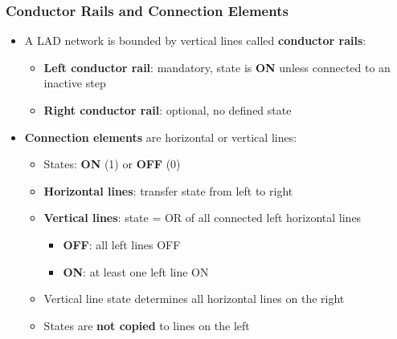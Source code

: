 \begin{frame}
	\frametitle{Conductor Rails and Connection Elements}
	\begin{itemize}
		\item A LAD network is bounded by vertical lines called \textbf{conductor rails}:
		\begin{itemize}
			\item \textbf{Left conductor rail}: mandatory, state is \textbf{ON} unless connected to an inactive step
			\item \textbf{Right conductor rail}: optional, no defined state
		\end{itemize}
		\item \textbf{Connection elements} are horizontal or vertical lines:
		\begin{itemize}
			\item States: \textbf{ON} (1) or \textbf{OFF} (0)
			\item \textbf{Horizontal lines}: transfer state from left to right
			\item \textbf{Vertical lines}: state = OR of all connected left horizontal lines
			\begin{itemize}
				\item \textbf{OFF}: all left lines OFF
				\item \textbf{ON}: at least one left line ON
			\end{itemize}
			\item Vertical line state determines all horizontal lines on the right
			\item States are \textbf{not copied} to lines on the left
		\end{itemize}
	\end{itemize}
\end{frame}

